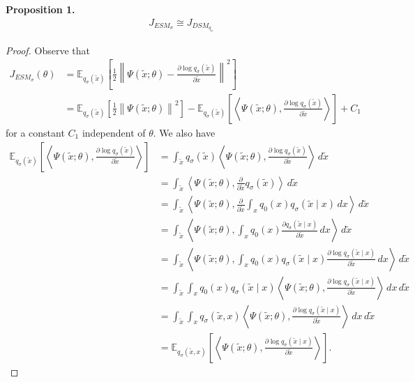 \documentclass[10pt]{article}
\newcommand{\EE}{\mathbb{E}}
\newcommand{\inner}[2]{\left\langle #1, #2 \right\rangle}
\newcommand{\ESMP}{J_{ESM_\sigma}}
\newcommand{\DSM}{J_{DSM_{q_\sigma}}}
\begin{document}
\newpage


\textbf{Proposition 1.}
\begin{align*}
\ESMP \cong \DSM
\end{align*}

\begin{proof}
Observe that
\begin{align*}
\ESMP(\theta) &= \EE_{q_\sigma(\tilde{x})} \left[ \frac{1}{2} \left\| \Psi(\tilde{x};\theta) - \frac{\partial \log q_\sigma(\tilde{x})}{\partial \tilde{x}} \right\|^2 \right] \\
&= \EE_{q_\sigma(\tilde{x})} \left[ \frac{1}{2} \left\| \Psi(\tilde{x};\theta) \right\|^2 \right] - \EE_{q_\sigma(\tilde{x})} \left[ \inner{\Psi(\tilde{x};\theta)}{\frac{\partial \log q_\sigma(\tilde{x})}{\partial \tilde{x}}} \right] + C_1
\end{align*}
for a constant $C_1$ independent of $\theta$. We also have
\begin{align*}
\EE_{q_\sigma(\tilde{x})} \left[ \inner{\Psi(\tilde{x};\theta)}{\frac{\partial \log q_\sigma(\tilde{x})}{\partial \tilde{x}}} \right] &= \int_{\tilde{x}} q_\sigma(\tilde{x}) \inner{\Psi(\tilde{x};\theta)}{\frac{\partial \log q_\sigma(\tilde{x})}{\partial \tilde{x}}} \, d\tilde{x} \\
&= \int_{\tilde{x}} \inner{\Psi(\tilde{x};\theta)}{\frac{\partial}{\partial \tilde{x}} q_\sigma(\tilde{x})} \, d\tilde{x} \\
&= \int_{\tilde{x}} \inner{\Psi(\tilde{x};\theta)}{\frac{\partial}{\partial \tilde{x}} \int_x q_0(x) q_\sigma(\tilde{x} \mid x) \, dx} \, d\tilde{x} \\
&= \int_{\tilde{x}} \inner{\Psi(\tilde{x};\theta)}{\int_x q_0(x) \frac{\partial q_\sigma(\tilde{x} \mid x)}{\partial \tilde{x}} \, dx} \, d\tilde{x} \\
&= \int_{\tilde{x}} \inner{\Psi(\tilde{x};\theta)}{\int_x q_0(x) q_\sigma(\tilde{x} \mid x) \frac{\partial \log q_\sigma(\tilde{x} \mid x)}{\partial \tilde{x}} \, dx} \, d\tilde{x} \\
&= \int_{\tilde{x}} \int_x q_0(x) q_\sigma(\tilde{x} \mid x) \inner{\Psi(\tilde{x};\theta)}{\frac{\partial \log q_\sigma(\tilde{x} \mid x)}{\partial \tilde{x}}}  \, dx \, d\tilde{x} \\
&= \int_{\tilde{x}} \int_x q_\sigma(\tilde{x},x) \inner{\Psi(\tilde{x};\theta)}{\frac{\partial \log q_\sigma(\tilde{x} \mid x)}{\partial \tilde{x}}}  \, dx \, d\tilde{x} \\
&= \EE_{q_\sigma(\tilde{x},x)} \left[ \inner{\Psi(\tilde{x};\theta)}{\frac{\partial \log q_\sigma(\tilde{x} \mid x)}{\partial \tilde{x}}} \right].

\end{align*}
\end{proof}
\end{document}
